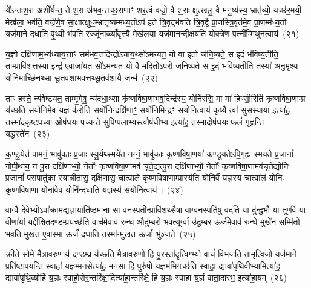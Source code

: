 ये᳚\-ऽन्तःश॒रा अशी᳚र्यन्त॒ ते श॒रा अ॑भव॒न्तच्छ॒राणाꣳ॑ शर॒त्वं वज्रो॒ वै श॒राः क्षुत्खलु॒ वै म॑नु॒ष्य॑स्य॒ भ्रातृ॑व्यो॒ यच्छ॑र॒मयी॒ मेख॑ला॒ भव॑ति॒ वज्रे॑णै॒व सा॒क्षात्क्षुध॒म्भ्रातृ॑व्यम्मध्य॒तो\-ऽप॑ हते त्रि॒वृद्भ॑वति त्रि॒वृद्वै प्रा॒णस्त्रि॒वृत॑मे॒व प्रा॒णम्म॑ध्य॒तो यज॑माने दधाति पृ॒थ्वी भ॑वति॒ रज्जू॑ना॒व्व्याँवृ॑त्त्यै॒ मेख॑लया॒ यज॑मानन्दीक्षयति॒ योक्त्रे॑ण॒ पत्नी᳚म्मिथुन॒त्वाय॑~(२१)

य॒ज्ञो दक्षि॑णाम॒भ्य॑ध्याय॒त्ताꣳ सम॑भव॒त्तदिन्द्रो॑\-ऽचाय॒थ्सो॑\-ऽमन्यत॒ यो वा इ॒तो ज॑नि॒ष्यते॒ स इ॒दं भ॑विष्य॒तीति॒ ताम्प्रावि॑श॒त्तस्या॒ इन्द्र॑ ए॒वाजा॑यत॒ सो॑\-ऽमन्यत॒ यो वै मदि॒तो\-ऽप॑रो जनि॒ष्यते॒ स इ॒दं भ॑विष्य॒तीति॒ तस्या॑ अनु॒मृश्य॒ योनि॒माच्छि॑न॒थ्सा सू॒तव॑शाभव॒त्तथ्सू॒तव॑शायै॒ जन्म॑~(२२)

ताꣳ हस्ते॒ न्य॑वेष्टयत॒ ताम्मृ॒गेषु॒ न्य॑दधा॒थ्सा कृ॑ष्णविषा॒णाभ॑व॒दिन्द्र॑स्य॒ योनि॑रसि॒ मा मा॑ हिꣳसी॒रिति॑ कृष्णविषा॒णाम्प्र य॑च्छति॒ सयो॑निमे॒व य॒ज्ञं क॑रोति॒ सयो॑नि॒न्दक्षि॑णा॒ꣳ॒ सयो॑नि॒मिन्द्रꣳ॑ सयोनि॒त्वाय॑ कृ॒ष्यै त्वा॑ सुस॒स्याया॒ इत्या॑ह॒ तस्मा॑दकृष्टप॒च्या ओष॑धयः पच्यन्ते सुपिप्प॒लाभ्य॒स्त्वौष॑धीभ्य॒ इत्या॑ह॒ तस्मा॒दोष॑धयः॒ फलं॑ गृह्णन्ति॒ यद्धस्ते॑न~(२३)

क॒ण्डू॒येत॑ पामनं॒ भावु॑काः प्र॒जाः स्यु॒र्यथ्स्मये॑त नग्नं॒ भावु॑काः कृष्णविषा॒णया॑ कण्डूयते\-ऽपि॒गृह्य॑ स्मयते प्र॒जानां᳚ गोपी॒थाय॒ न पु॒रा दक्षि॑णाभ्यो॒ नेतोः᳚ कृष्णविषा॒णामव॑ चृते॒द्यत्पु॒रा दक्षि॑णाभ्यो॒ नेतोः᳚ कृष्णविषा॒णामव॑चृ॒तेद्योनिः॑ प्र॒जानां᳚ परा॒पातु॑का स्यान्नी॒तासु॒ दक्षि॑णासु॒ चात्वा॑ले कृष्णविषा॒णाम्प्रास्य॑ति॒ योनि॒र्वै य॒ज्ञस्य॒ चात्वा॑लं॒ योनिः॑ कृष्णविषा॒णा योना॑वे॒व योनि॑न्दधाति य॒ज्ञस्य॑ सयोनि॒त्वाय॑॥~(२४)

{\anuvakamend[{रु॒न्ध॒ ए॒ष तस्मा᳚च्छर॒मयी॒ यूप॒स्तृती॑यम्मिथुन॒त्वाय॒ जन्म॒ हस्ते॑ना॒ष्टाच॑त्वारिꣳशच्च}]}%

वाग्वै दे॒वेभ्यो\-ऽपा᳚क्रामद्यज्ञा॒याति॑ष्ठमाना॒ सा वन॒स्पती॒न्प्रावि॑श॒थ्सैषा वाग्वन॒स्पति॑षु वदति॒ या दु॑न्दु॒भौ या तूण॑वे॒ या वीणा॑यां॒ यद्दी᳚क्षितद॒ण्डम्प्र॒यच्छ॑ति॒ वाच॑मे॒वाव॑ रुन्ध॒ औदु॑म्बरो भव॒त्यूर्ग्वा उ॑दु॒म्बर॒ ऊर्ज॑मे॒वाव॑ रुन्धे॒ मुखे॑न॒ सम्मि॑तो भवति मुख॒त ए॒वास्मा॒ ऊर्जं॑ दधाति॒ तस्मा᳚न्मुख॒त ऊ॒र्जा भु॑ञ्जते~(२५)

क्री॒ते सोमे॑ मैत्रावरु॒णाय॑ द॒ण्डम्प्र य॑च्छति मैत्रावरु॒णो हि पु॒रस्ता॑दृ॒त्विग्भ्यो॒ वाचं॑ वि॒भज॑ति॒ तामृ॒त्विजो॒ यज॑माने॒ प्रति॑\-ष्ठापयन्ति॒ स्वाहा॑ य॒ज्ञम्मन॒सेत्या॑ह॒ मन॑सा॒ हि पुरु॑षो य॒ज्ञम॑भि॒गच्छ॑ति॒ स्वाहा॒ द्यावा॑पृथि॒वीभ्या॒मित्या॑ह॒ द्यावा॑पृथि॒व्योर्\mbox{}हि य॒ज्ञः स्वाहो॒रोर॒न्तरि॑क्षा॒दित्या॑हा॒न्तरि॑क्षे॒ हि य॒ज्ञः स्वाहा॑ य॒ज्ञं वाता॒दार॑भ॒ इत्या॑हा॒यम्~(२६)


